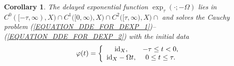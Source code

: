 \documentclass[12pt]{article}
\newtheorem{corollary}[theorem]{Corollary}
\numberwithin{equation}{section}
\numberwithin{equation}{section}
\begin{document}
	\begin{corollary}
		The delayed exponential function $\exp_{\tau}(\cdot; -\Omega)$ lies in $C^{0}([-\tau, \infty), X) \cap C^{1}\big([0, \infty), X\big) \cap C^{2}\big([\tau, \infty), X) \cap $
		and solves the Cauchy problem (\ref{EQUATION_DDE_FOR_DEXP_1})--(\ref{EQUATION_DDE_FOR_DEXP_2})
		with the initial data
		\begin{equation}
			\varphi(t) = \left\{
			\begin{array}{cc}
				\mathrm{id}_{X}, & -\tau \leq t < 0, \\
				\mathrm{id}_{X} - \Omega t, & 0 \leq t \leq \tau. 
			\end{array}
			\right. \notag
		\end{equation}
	\end{corollary}
\end{document}
